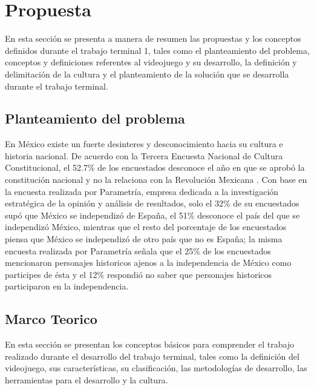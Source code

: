 \section{Propuesta}
En esta sección se presenta a manera de resumen las propuestas y los conceptos 
definidos durante el trabajo terminal 1, tales como el planteamiento del problema, 
conceptos y definiciones referentes al videojuego y su desarrollo, la definición 
y delimitación de la cultura y el planteamiento de la solución que se desarrolla 
durante el trabajo terminal.  

\subsection{Planteamiento del problema}
En México existe un fuerte desinteres y desconocimiento hacia su cultura e historia 
nacional. De acuerdo con la Tercera Encuesta Nacional de Cultura Constitucional, 
el 52.7\% de los encuestados desconoce el año en que se aprobó la constitución 
nacional y no la relaciona con la Revolución Mexicana \cite{RefConsti}. Con base 
en la encuesta realizada por Parametría, empresa dedicada a la investigación 
estratégica de la opinión y análisis de resultados, solo el 32\% de su encuestados 
supó que México se independizó de España, el 51\% desconoce el país del que se 
independizó México, mientras que el resto del porcentaje de los encuestados 
piensa que México se independizó de otro país que no es España; la misma 
encuesta realizada por Parametría señala que el 25\% de los encuestados mencionaron 
personajes historicos ajenos a la independencia de México como participes de 
ésta y el 12\% respondió no saber que personajes historicos participaron en la 
independencia\cite{RefParametria}. 
 
\subsection{Marco Teorico}
En esta sección se presentan los conceptos básicos para comprender el trabajo 
realizado durante el desarrollo del trabajo terminal, tales como la definición 
del videojuego, sus características, su clasificación, las metodologías de 
desarrollo, las herramientas para el desarrollo y la cultura. 

